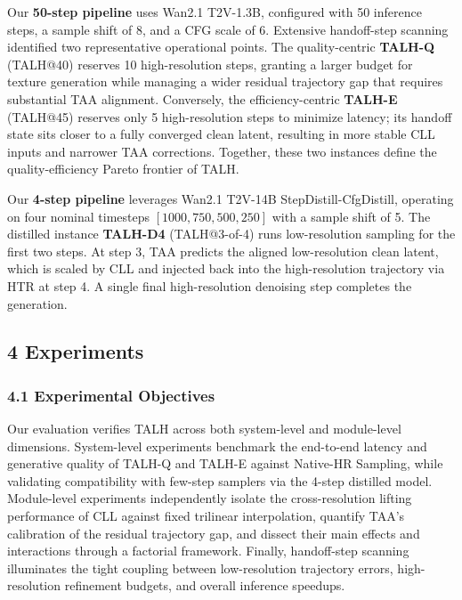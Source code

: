 Our \textbf{50-step pipeline} uses Wan2.1 T2V-1.3B, configured with 50 inference steps, a sample shift of 8, and a CFG scale of 6. Extensive handoff-step scanning identified two representative operational points. The quality-centric \textbf{TALH-Q} (TALH@40) reserves 10 high-resolution steps, granting a larger budget for texture generation while managing a wider residual trajectory gap that requires substantial TAA alignment. Conversely, the efficiency-centric \textbf{TALH-E} (TALH@45) reserves only 5 high-resolution steps to minimize latency; its handoff state sits closer to a fully converged clean latent, resulting in more stable CLL inputs and narrower TAA corrections. Together, these two instances define the quality-efficiency Pareto frontier of TALH.

Our \textbf{4-step pipeline} leverages Wan2.1 T2V-14B StepDistill-CfgDistill, operating on four nominal timesteps \([1000, 750, 500, 250]\) with a sample shift of 5. The distilled instance \textbf{TALH-D4} (TALH@3-of-4) runs low-resolution sampling for the first two steps. At step 3, TAA predicts the aligned low-resolution clean latent, which is scaled by CLL and injected back into the high-resolution trajectory via HTR at step 4. A single final high-resolution denoising step completes the generation.

\hypertarget{experiments}{%
\subsection{4 Experiments}\label{experiments}}

\hypertarget{experimental-objectives}{%
\subsubsection{4.1 Experimental Objectives}\label{experimental-objectives}}

Our evaluation verifies TALH across both system-level and module-level dimensions. System-level experiments benchmark the end-to-end latency and generative quality of TALH-Q and TALH-E against Native-HR Sampling, while validating compatibility with few-step samplers via the 4-step distilled model. Module-level experiments independently isolate the cross-resolution lifting performance of CLL against fixed trilinear interpolation, quantify TAA's calibration of the residual trajectory gap, and dissect their main effects and interactions through a factorial framework. Finally, handoff-step scanning illuminates the tight coupling between low-resolution trajectory errors, high-resolution refinement budgets, and overall inference speedups.

